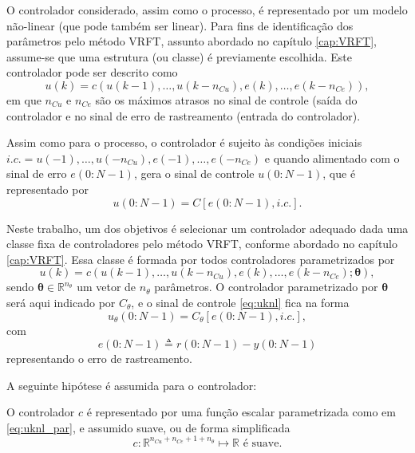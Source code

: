 O controlador considerado, assim como o processo, é representado por um modelo não-linear (que pode também ser linear). Para fins de identificação dos parâmetros pelo método VRFT, assunto abordado no capítulo \ref{cap:VRFT}, assume-se que uma estrutura (ou classe) é previamente escolhida. Este controlador pode ser descrito como
\begin{equation}
   u(k)=c\left(u(k-1), \ldots, u(k-n_{C u}), e(k), \ldots, e(k-n_{C e})\right),
\label{eq:uknl}
\end{equation}
em que $n_{Cu}$ e $n_{Ce}$ são os máximos atrasos no sinal de controle (saída do controlador e no sinal de erro de rastreamento (entrada do controlador).

Assim como para o processo, o controlador é sujeito às condições iniciais $i.c.= u(-1), \ldots, u(-n_{C u}), e(-1), \ldots, e(-n_{C e})$
e quando alimentado com o sinal de erro $e(0{:}N-1)$, gera o sinal de controle $u(0{:}N-1)$, que é representado por
\begin{equation}
   u(0{:}N-1)=C[e(0{:}N-1), i.c.].
\label{eq:Cnl}
\end{equation}

Neste trabalho, um dos objetivos é selecionar um controlador adequado dada uma classe fixa de controladores pelo método VRFT, conforme abordado no capítulo \ref{cap:VRFT}. Essa classe é formada por todos controladores parametrizados por
\begin{equation}
   u(k)=c\left(u(k-1), \ldots, u(k-n_{C u}), e(k), \ldots, e(k-n_{C e}); \bm{\theta}\right),
\label{eq:uknl_par}
\end{equation}
sendo $\bm{\theta} \in \mathbb{R}^{n_\theta}$ um vetor de $n_{\theta}$ parâmetros. O controlador parametrizado por $\bm{\theta}$ será aqui indicado por $C_{\theta}$, e o sinal de controle \eqref{eq:uknl} fica na forma 
\begin{equation}
   u_{\theta}(0{:}N-1)=C_{\theta}[e(0{:}N-1), i.c.],
\label{eq:utheta}
\end{equation}
com
\begin{equation}
   e(0{:} N-1)\triangleq r(0{:} N-1)-y(0{:} N-1)
\label{eq:erro}
\end{equation}
representando o erro de rastreamento.

A seguinte hipótese é assumida para o controlador:
\begin{assum}
   O controlador $c$ é representado por uma função escalar parametrizada como em \eqref{eq:uknl_par}, e assumido suave, ou de forma simplificada
   \begin{equation}
      c:\mathbb{R}^{n_{Cu}+n_{Ce}+1+n_{\theta}} \mapsto \mathbb{R} \text{ é suave}.
      \label{eq:assumcon}
   \end{equation}
\end{assum}



